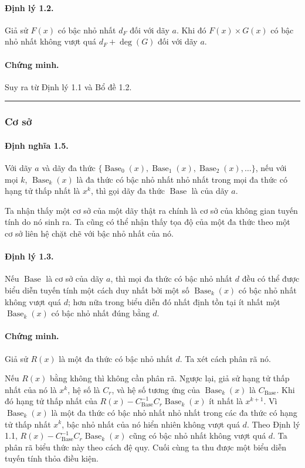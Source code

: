 \documentclass[11pt]{article}
\newcommand{\Base}{\operatorname{Base}}
\newcommand{\qedmark}{\hfill\rule{0.7ex}{0.7ex}}
\begin{document}
\paragraph{Định lý 1.2.}
Giả sử \(F(x)\) có bậc nhỏ nhất \(d_F\) đối với dãy \(a\). Khi đó
\(F(x)\times G(x)\) có bậc nhỏ nhất không vượt quá \(d_F+\deg(G)\) đối với dãy
\(a\).

\paragraph{Chứng minh.}
Suy ra từ Định lý 1.1 và Bổ đề 1.2. \qedmark

\subsubsection{Cơ sở}

\paragraph{Định nghĩa 1.5.}
Với dãy \(a\) và dãy đa thức
\(\{\Base_0(x),\Base_1(x),\Base_2(x),\ldots\}\), nếu với mọi \(k\),
\(\Base_k(x)\) là đa thức có bậc nhỏ nhất nhỏ nhất trong mọi đa thức có hạng
tử thấp nhất là \(x^k\), thì gọi dãy đa thức \(\Base\) là  của
dãy \(a\).

Ta nhận thấy một cơ sở của một dãy thật ra chính là cơ sở của không gian tuyến
tính do nó sinh ra. Ta cũng có thể nhận thấy tọa độ của một đa thức theo một
cơ sở liên hệ chặt chẽ với bậc nhỏ nhất của nó.

\paragraph{Định lý 1.3.}
Nếu \(\Base\) là cơ sở của dãy \(a\), thì mọi đa thức có bậc nhỏ nhất \(d\) đều
có thể được biểu diễn tuyến tính một cách duy nhất bởi một số \(\Base_k(x)\) có
bậc nhỏ nhất không vượt quá \(d\); hơn nữa trong biểu diễn đó nhất định tồn
tại ít nhất một \(\Base_k(x)\) có bậc nhỏ nhất đúng bằng \(d\).

\paragraph{Chứng minh.}
Giả sử \(R(x)\) là một đa thức có bậc nhỏ nhất \(d\). Ta xét cách phân rã nó.

Nếu \(R(x)\) bằng không thì không cần phân rã. Ngược lại, giả sử hạng tử thấp
nhất của nó là \(x^k\), hệ số là \(C_r\), và hệ số tương ứng của \(\Base_k(x)\)
là \(C_{\Base}\). Khi đó hạng tử thấp nhất của
\(R(x)-C_{\Base}^{-1}C_r\Base_k(x)\) ít nhất là \(x^{k+1}\). Vì \(\Base_k(x)\)
là một đa thức có bậc nhỏ nhất nhỏ nhất trong các đa thức có hạng tử thấp nhất
\(x^k\), bậc nhỏ nhất của nó hiển nhiên không vượt quá \(d\). Theo Định lý 1.1,
\(R(x)-C_{\Base}^{-1}C_r\Base_k(x)\) cũng có bậc nhỏ nhất không vượt quá \(d\).
Ta phân rã biểu thức này theo cách đệ quy. Cuối cùng ta thu được một biểu diễn
tuyến tính thỏa điều kiện.
\end{document}
